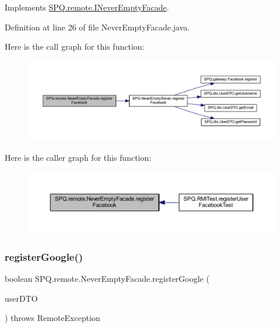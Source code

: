 Implements \mbox{\hyperlink{interface_s_p_q_1_1remote_1_1_i_never_empty_facade_a7b2f025522489fe9070d09a4fb08f0a1}{S\+P\+Q.\+remote.\+I\+Never\+Empty\+Facade}}.



Definition at line 26 of file Never\+Empty\+Facade.\+java.

Here is the call graph for this function\+:
\nopagebreak
\begin{figure}[H]
\begin{center}
\leavevmode
\includegraphics[width=350pt]{class_s_p_q_1_1remote_1_1_never_empty_facade_aa9845001ecd5228135d64415a4c12b20_cgraph}
\end{center}
\end{figure}
Here is the caller graph for this function\+:
\nopagebreak
\begin{figure}[H]
\begin{center}
\leavevmode
\includegraphics[width=350pt]{class_s_p_q_1_1remote_1_1_never_empty_facade_aa9845001ecd5228135d64415a4c12b20_icgraph}
\end{center}
\end{figure}
\mbox{\label{class_s_p_q_1_1remote_1_1_never_empty_facade_aaa8d4a6148957029af068d00da24890b}} 
\subsubsection{\texorpdfstring{register\+Google()}{registerGoogle()}}
{\footnotesize\ttfamily boolean S\+P\+Q.\+remote.\+Never\+Empty\+Facade.\+register\+Google (\begin{DoxyParamCaption}\item[{\mbox{\hyperlink{class_s_p_q_1_1dto_1_1_user_d_t_o}{User\+D\+TO}}}]{user\+D\+TO }\end{DoxyParamCaption}) throws Remote\+Exception}



